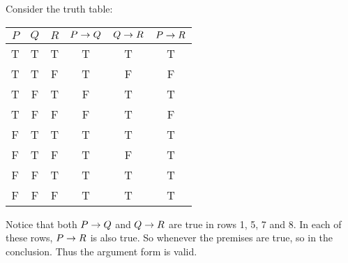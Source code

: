 \documentclass[11pt]{exam}
\begin{document}
\begin{questions}
\begin{parts}
  \begin{solution}
    Consider the truth table:
    
    \begin{tabular}{c|c|c||c|c|c}
      $P$ & $Q$ & $R$ & $P\rightarrow Q$ & $Q \rightarrow R$ & $P \rightarrow R$ \\ \hline
      T   &  T  &  T  &     T     &      T     &      T \\
      T   &  T  &  F  &     T     &      F     &      F \\
      T   &  F  &  T  &     F     &      T     &      T \\
      T   &  F  &  F  &     F     &      T     &      F \\
      F   &  T  &  T  &     T     &      T     &      T \\
      F   &  T  &  F  &     T     &      F     &      T \\
      F   &  F  &  T  &     T     &      T     &      T \\
      F   &  F  &  F  &     T     &      T     &      T \\
    \end{tabular}
    Notice that both $P \rightarrow Q$ and $Q \rightarrow R$ are true in rows 1, 5, 7 and 8.  In each of these rows, $P \rightarrow R$ is also true.  So whenever the premises are true, so in the conclusion.  Thus the argument form is valid.
  \end{solution}


\end{parts}
\end{questions}
\end{document}
